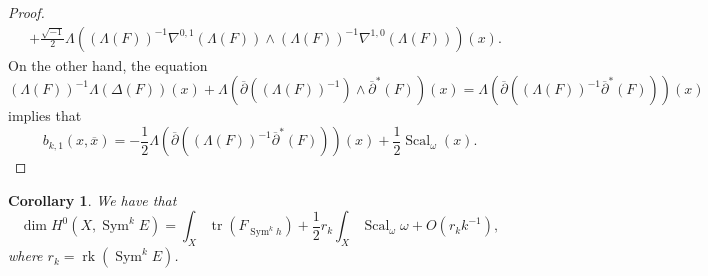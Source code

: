 \documentclass{amsart}
\newtheorem{cor}[thm]{Corollary}
\theoremstyle{definition}
\theoremstyle{remark}
\numberwithin{equation}{section}
\DeclareMathOperator{\Sym}{Sym}
\DeclareMathOperator{\tr}{tr}
\DeclareMathOperator{\rk}{rk}
\DeclareMathOperator{\Scal}{Scal}
\begin{document}
\begin{proof}
\begin{equation*}
\begin{split}
    & +  \frac{\sqrt{-1}}{2} \Lambda  \left ( (\Lambda(F))^{-1} \nabla^{0,1}(\Lambda(F)) \wedge (\Lambda(F))^{-1} \nabla^{1,0}(\Lambda (F))   \right ) (x).
\end{split}
\end{equation*}
On the other hand, the equation
\begin{equation*}
(\Lambda (F) )^{-1} \Lambda (\Delta (F)) (x) 
+ \Lambda  \left ( \overline{\partial} \left ( (\Lambda (F))^{-1} \right ) \wedge \overline{\partial}^* (F)  \right ) (x) =  \Lambda \left (  \overline{\partial} \left ( (\Lambda (F) )^{-1} \overline{\partial}^* (F) \right ) \right ) (x) 
\end{equation*}
implies that 
\begin{equation*}
    b_{k,1}(x,\overline{x})  =    -\frac{1}{2} \Lambda \left (  \overline{\partial} \left ( (\Lambda (F) )^{-1} \overline{\partial}^* (F) \right ) \right ) (x) 
+ \frac{1}{2}\Scal_\omega(x).
\end{equation*}


\end{proof}


\begin{cor} \label{cor: Riemann-Roch}
We have that
\begin{equation*}
    \dim H^0(X, \Sym^k E) = \int_X \tr (F_{\Sym^k h}) + \frac{1}{2} r_k \int_X \Scal_\omega  \omega + O(r_k k^{-1}),
\end{equation*}
where $r_k = \rk(\Sym^k E)$.
\end{cor}
\end{document}
